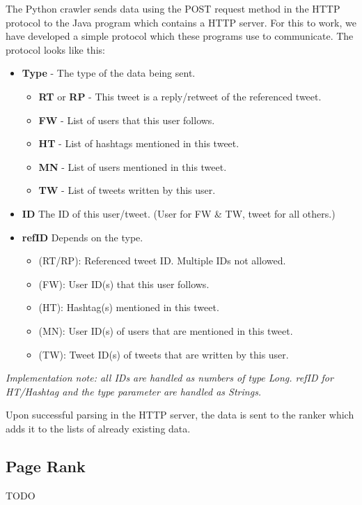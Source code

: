 \documentclass[12pt,a4paper]{article}
\begin{document}
The Python crawler sends data using the POST request method in the HTTP protocol to the Java program which contains a HTTP server. For this to work, we have developed a simple protocol which these programs use to communicate. The protocol looks like this:

\begin{itemize}
	\item \textbf{Type} - The type of the data being sent.
	\begin{itemize}
		\item \textbf{RT} or \textbf{RP} - This tweet is a reply/retweet of the referenced tweet.
		\item \textbf{FW} - List of users that this user follows.
		\item \textbf{HT} - List of hashtags mentioned in this tweet.
		\item \textbf{MN} - List of users mentioned in this tweet.
		\item \textbf{TW} - List of tweets written by this user.
	\end{itemize}
	\item \textbf{ID} The ID of this user/tweet. (User for FW \& TW, tweet for all others.)
	\item \textbf{refID} Depends on the type.
	\begin{itemize}
		\item[] (RT/RP): Referenced tweet ID. Multiple IDs not allowed.
		\item[] (FW): User ID(s) that this user follows.
		\item[] (HT): Hashtag(s) mentioned in this tweet.
		\item[] (MN): User ID(s) of users that are mentioned in this tweet.
		\item[] (TW): Tweet ID(s) of tweets that are written by this user.
	\end{itemize}
\end{itemize}

\textit{Implementation note: all IDs are handled as numbers of type Long. refID for HT/Hashtag and the type parameter are handled as Strings.}

Upon successful parsing in the HTTP server, the data is sent to the ranker which adds it to the lists of already existing data.

\subsection{Page Rank}
TODO
\end{document}
